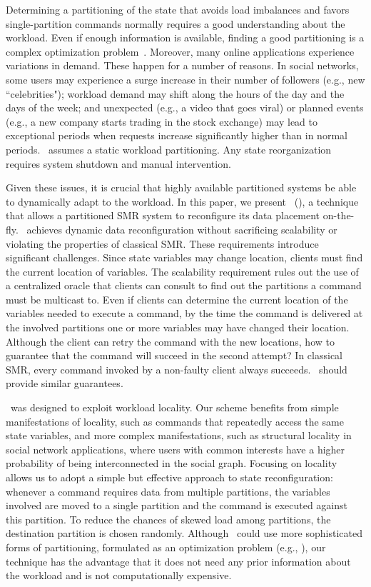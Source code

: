 Determining a partitioning of the state that avoids load imbalances and favors single-partition commands normally requires a good understanding about the workload. 
Even if enough information is available, finding a good partitioning is a complex optimization problem~\cite{curino2010sch,taft2014est}.
Moreover, many online applications experience variations in demand. 
These happen for a number of reasons. 
In social networks, some users may experience a surge increase in their number of followers (e.g., new ``celebrities");
workload demand may shift along the hours of the day and the days of the week; and unexpected (e.g., a video that goes viral) or planned events (e.g., a new company starts trading in the stock exchange) may lead to exceptional periods when requests increase significantly higher than in normal periods.
\ssmr\ assumes a static workload partitioning.
Any state reorganization requires system shutdown and manual intervention.

Given these issues, it is crucial that highly available partitioned systems be able to dynamically adapt to the workload.
In this paper, we present \dssmrlong\ (\dssmr), a technique that allows a partitioned SMR system to reconfigure its data placement on-the-fly.
\dssmr\ achieves dynamic data reconfiguration without sacrificing scalability or violating the properties of classical SMR.
These requirements introduce significant challenges.
Since state variables may change location, clients must find the current location of variables.
The scalability requirement rules out the use of a centralized oracle that clients can consult to find out the partitions a command must be multicast to.
Even if clients can determine the current location of the variables needed to execute a command, by the time the command is delivered at the involved partitions one or more variables may have changed their location.
Although the client can retry the command with the new locations, how to guarantee that the command will succeed in the second attempt?
In classical SMR, every command invoked by a non-faulty client always succeeds.
\dssmr\ should provide similar guarantees.

\dssmr\ was designed to exploit workload locality.
Our scheme benefits from simple manifestations of locality, such as commands that repeatedly access the same state variables, and more complex manifestations, such as structural locality in social network applications, where users with common interests have a higher probability of being interconnected in the social graph.
Focusing on locality allows us to adopt a simple but effective approach to state reconfiguration: whenever a command requires data from multiple partitions, the variables involved are moved to a single partition and the command is executed against this partition.
To reduce the chances of skewed load among partitions, the destination partition is chosen randomly.
Although \dssmr\ could use more sophisticated forms of partitioning, formulated as an optimization problem (e.g., \cite{curino2010sch,taft2014est}), our technique has the advantage that it does not need any prior information about the workload and is not computationally expensive.

